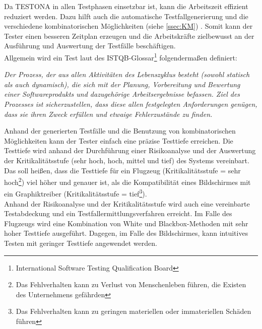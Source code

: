 Da TESTONA in allen Testphasen einsetzbar ist, kann die Arbeitszeit effizient reduziert werden. Dazu hilft auch die automatische Testfallgenerierung und die verschiedene kombinatorischen Möglichkeiten (siehe \ref{ssec:KM}) . Somit kann der Tester einen besseren Zeitplan erzeugen und die Arbeitskräfte zielbewusst an der Ausführung und Auswertung der Testfälle beschäftigen.\\

Allgemein wird ein Test laut des ISTQB-Glossar\footnote{International Software Testing Qualification Board} folgendermaßen definiert:

\begin{center}
\textit{
Der Prozess, der aus allen Aktivitäten des Lebenszyklus besteht (sowohl statisch als auch dynamisch), die sich mit der Planung, Vorbereitung und Bewertung einer Softwareprodukts und dazugehörige Arbeitsergebnisse befassen. Ziel des Prozesses ist sicherzustellen, dass diese allen festgelegten Anforderungen genügen, dass sie ihren Zweck erfüllen und etwaige Fehlerzustände zu finden.}\cite{SoftwareTestEmbSys}\\

\end{center}

Anhand der generierten Testfälle und die Benutzung von kombinatorischen Möglichkeiten kann der Tester einfach eine präzise Testtiefe erreichen. Die Testtiefe wird anhand der Durchführung einer Risikoanalyse und der Auswertung der Kritikalitätsstufe (sehr hoch, hoch, mittel und tief) des Systems vereinbart. Das soll heißen, dass die Testtiefe für ein Flugzeug (Kritikalitätsstufe = sehr hoch\footnote{Das Fehlverhalten kann zu Verlust von Menschenleben führen, die Existen des Unternehmens gefährden}) viel höher und genauer ist, als die Kompatibilität eines Bildschirmes mit ein Graphiktreiber (Kritikalitätsstufe = tief\footnote{Das Fehlverhalten kann zu geringen materiellen oder immateriellen Schäden führen}).\\

Anhand der Risikoanalyse und der Kritikalitätsstufe wird auch eine vereinbarte Testabdeckung und ein Testfallermittlungsverfahren erreicht. Im Falle des Flugzeugs wird eine Kombination von White und Blackbox-Methoden mit sehr hoher Testtiefe ausgeführt. Dagegen, im Falle des Bildschirmes, kann intuitives Testen mit geringer Testtiefe angewendet werden.\cite{ApplicationEngineering}

